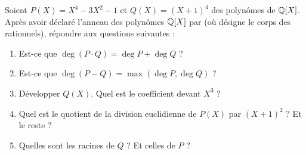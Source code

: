 \begin{frame}[fragile]
\begin{tp}
Soient  $P(X) = X^4-3X^2-1$ et $Q(X) = (X+1)^4$ des polynômes de $\mathbb{Q}[X]$.
Après avoir déclaré l'anneau des polynômes $\mathbb{Q}[X]$ par  
(où  désigne le corps des rationnels), répondre aux questions suivantes : \pause
\begin{enumerate}
  \item Est-ce que $\deg(P \cdot Q) = \deg P + \deg Q$ ?\pause
  \item Est-ce que $\deg(P - Q) = \max( \deg P, \deg Q )$ ?\pause
  \item Développer $Q(X)$. Quel est le coefficient devant $X^3$ ? \pause
  \item Quel est le quotient de la division euclidienne de $P(X)$ par $(X+1)^2$ ?
  Et le reste ?\pause
  \item Quelles sont les racines de $Q$ ? Et celles de $P$ ?
\end{enumerate}
\end{tp}





\end{frame}


